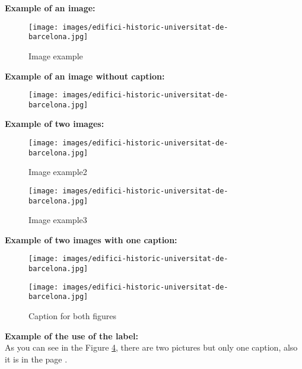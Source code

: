 \textbf{Example of an image:}
\begin{figure}[H]
    \centering
    \texttt{[image: images/edifici-historic-universitat-de-barcelona.jpg]}
    \caption{Image example}
    \label{fig:image_example}
\end{figure}

\textbf{Example of an image without caption:}
\begin{figure}[H]
    \centering
    \texttt{[image: images/edifici-historic-universitat-de-barcelona.jpg]}
    \label{fig:image_example_no_caption}
\end{figure}


\textbf{Example of two images:}
\begin{figure}[H]
    \centering
    \begin{minipage}[t]{0.48\textwidth}
        \centering
        \texttt{[image: images/edifici-historic-universitat-de-barcelona.jpg]}
        \caption{Image example2}
        \label{fig:image_example2}
    \end{minipage}
    \begin{minipage}[t]{0.48\textwidth}
        \centering
        \texttt{[image: images/edifici-historic-universitat-de-barcelona.jpg]}
        \caption{Image example3}
        \label{fig:image_example3}
    \end{minipage}
\end{figure}



\textbf{Example of two images with one caption:}
\begin{figure}[h]
  \centering
  \begin{minipage}{0.45\textwidth}
    \centering
    \texttt{[image: images/edifici-historic-universitat-de-barcelona.jpg]}
  \end{minipage}
  \begin{minipage}{0.45\textwidth}
    \centering
    \texttt{[image: images/edifici-historic-universitat-de-barcelona.jpg]}
  \end{minipage}
  \caption{Caption for both figures}
  \label{fig:two_images}
\end{figure}


\textbf{Example of the use of the label:} \\
As you can see in the Figure \ref{fig:two_images}, there are two pictures but only one caption, also it is in the page \pageref{fig:two_images}.


